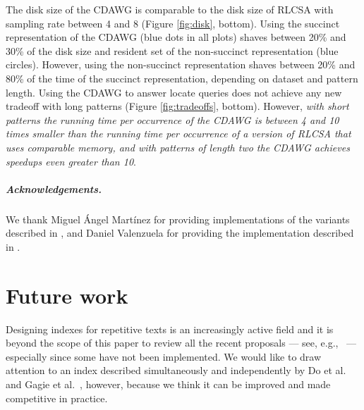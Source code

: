\documentclass[a4paper,UKenglish]{lipics-v2016}
\begin{document}
The disk size of the CDAWG is comparable to the disk size of RLCSA with sampling rate between 4 and 8 (Figure \ref{fig:disk}, bottom). Using the succinct representation of the CDAWG (blue dots in all plots) shaves between 20\% and 30\% of the disk size and resident set of the non-succinct representation (blue circles). However, using the non-succinct representation shaves between 20\% and 80\% of the time of the succinct representation, depending on dataset and pattern length. Using the CDAWG to answer locate queries does not achieve any new tradeoff with long patterns (Figure \ref{fig:tradeoffs}, bottom). However, \emph{with short patterns the running time per occurrence of the CDAWG is between 4 and 10 times smaller than the running time per occurrence of a version of RLCSA that uses comparable memory, and with patterns of length two the CDAWG achieves speedups even greater than 10}.















































\subparagraph*{Acknowledgements.}

We thank Miguel \'{A}ngel Mart\'{i}nez for providing implementations of the variants described in \cite{kreft2010self}, and Daniel Valenzuela for providing the implementation described in \cite{valenzuela2016chico}.






\section{Future work}

Designing indexes for repetitive texts is an increasingly active field and it is beyond the scope of this paper to review all the recent proposals --- see, e.g.,~\cite{FGHP14,GGKNP14,TTS14,valenzuela2016chico} --- especially since some have not been implemented. We would like to draw attention to an index described simultaneously and independently by Do et al.~\cite{DJSS14} and Gagie et al.~\cite{GGKNP12}, however, because we think it can be improved and made competitive in practice.
\end{document}
